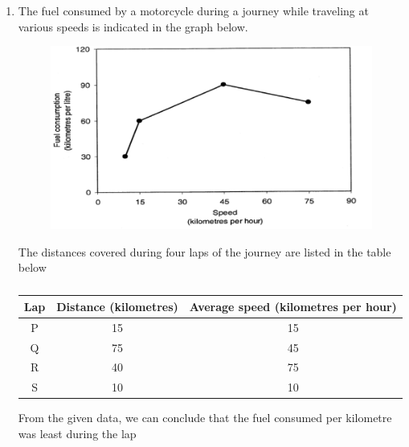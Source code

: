 \documentclass[a4paper, 11pt]{article}
\begin{document}
\begin{enumerate}
    \hfill{}

    \item The fuel consumed by a motorcycle during a journey while traveling at various speeds is indicated in the graph below.
    
    \begin{figure}[H]
        \centering
        \includegraphics[width=0.7\columnwidth]{figs/q62.png}
        \caption*{}
        \label{fig:q62_graph}
    \end{figure}
    
    The distances covered during four laps of the journey are listed in the table below
    
    \begin{table}[H]
        \centering
        \begin{tabular}{|c|c|c|}
            \hline
            \textbf{Lap} & \textbf{Distance (kilometres)} & \textbf{Average speed (kilometres per hour)} \\
            \hline
            P & 15 & 15 \\
            Q & 75 & 45 \\
            R & 40 & 75 \\
            S & 10 & 10 \\
            \hline
        \end{tabular}
        \caption*{}
        \label{tab:q62}
    \end{table}
    
    From the given data, we can conclude that the fuel consumed per kilometre was least during the lap
    
    \begin{enumerate}
    \end{enumerate}


\end{enumerate}
\end{document}
